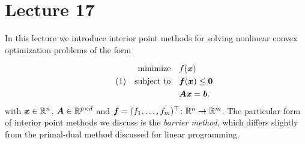 %
%
% 


\chapter*{Lecture 17}
\addtocounter{chapter}{17}
\addtocounter{section}{0}


In this lecture we introduce interior point methods for solving nonlinear convex optimization problems of the form

\begin{align}\label{eq:constr}\tag{1}
\begin{split}
 \text{minimize}\quad & f(\bm{x})\\
 \quad\text{subject to}\quad & \bm{f}(\bm{x})\leq \bm{0}\\
         & \bm{A}\bm{x} = \bm{b}.
\end{split}
\end{align}
with $\bm{x}\in \mathbb{R}^n$, $\bm{A}\in \mathbb{R}^{p\times d}$ and $\bm{f}=(f_1,\dots,f_m)^{\top}\colon \mathbb{R}^n\to \mathbb{R}^m$. The particular form of interior point methods we discuss is the {\em barrier method}, which differs slightly from the primal-dual method discussed for linear programming.

